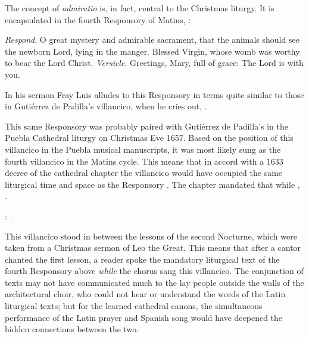 The concept of \emph{admiratio} is, in fact, central to the Christmas liturgy.
It is encapsulated in the fourth Responsory of Matins, :
\begin{quoting}
    \emph{Respond}. O great mystery and admirable sacrament, that the animals
    should see the newborn Lord, lying in the manger.
    Blessed Virgin, whose womb was worthy to bear the Lord Christ.\newline
    \emph{Versicle}. Greetings, Mary, full of grace: The Lord is with you.%
        \Autocite 
        [175: .]
        {Catholic:Breviarium1631}
\end{quoting}
In his sermon Fray Luis alludes to this Responsory in terms quite similar to
those in Gutiérrez de Padilla's villancico, when he cries out, .%
    \Autocite
    [38: ]
    {LuisdeGranada:Xmas}

This same Responsory was probably paired with Gutiérrez de Padilla's
 in the Puebla Cathedral liturgy on Christmas
Eve 1657.
Based on the position of this villancico in the Puebla musical manuscripts, it
was most likely sung as the fourth villancico in the Matins cycle.
This means that in accord with a 1633 decree of the cathedral chapter the
villancico would have occupied the same liturgical time and space as the
Responsory .
The chapter mandated that while , .%
\begin{Footnote}
    :
    .
\end{Footnote}
This villancico stood in between the lessons of the second Nocturne, which were
taken from a Christmas sermon of Leo the Great.
This means that after a cantor chanted the first lesson, a reader spoke the
mandatory liturgical text of the fourth Responsory above \emph{while} the chorus
sang this villancico.
The conjunction of texts may not have communicated much to the lay people
outside the walls of the architectural choir, who could not hear or understand
the words of the Latin liturgical texts; but for the learned cathedral canons,
the simultaneous performance of the Latin prayer and Spanish song would have
deepened the hidden connections between the two.

